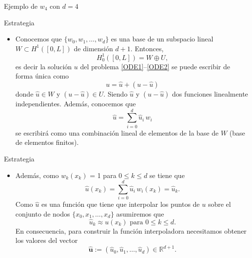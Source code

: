 \documentclass[10pt,handout]{beamer}
\theoremstyle{plain} %
\theoremstyle{plain} %
\theoremstyle{plain} %
\theoremstyle{plain} %
\theoremstyle{definition}
\theoremstyle{example}
\theoremstyle{example}
\theoremstyle{remark}
\theoremstyle{remark}
\begin{document}
\begin{frame}{Ejemplo de $w_4$ con $d=4$}
\end{frame}

\begin{frame}{Estrategia}
\begin{itemize}
\item Conocemos que $\{w_0,w_1,\ldots,w_d\}$ es una base de un subspacio lineal
$W \subset H^1([0,L])$ de dimensión $d+1.$ Entonces,
$$
H_0^1([0,L]) = W \oplus U,
$$
es decir la solución $u$ del problema \eqref{ODE1}--\eqref{ODE2} se puede escribir
de forma única como
$$
u = \widehat{u} + (u-\widehat{u})
$$
donde $ \widehat{u} \in W$ y $(u-\widehat{u}) \in U.$ Siendo $ \widehat{u}$ y $(u-\widehat{u})$ dos funciones linealmente independientes. Además, conocemos que
$$
\widehat{u} = \sum_{i=0}^d \widehat{u}_i \, w_i
$$
se escribirá como una combinación lineal de elementos de la base de $W$ (base de elementos finitos). 
\end{itemize}
\end{frame}

\begin{frame}{Estrategia}
\begin{itemize}
\item Además, como $w_k(x_k)$ = 1 para $0 \le k \le d$ se tiene que
$$
\widehat{u}(x_k) = \sum_{i=0}^d \widehat{u}_i \, w_i(x_k) = \widehat{u}_k.
$$
Como $\widehat{u}$ es una función que tiene que interpolar los puntos de $u$ sobre el conjunto
de nodos $\{x_0,x_1,\ldots,x_d\}$ asumiremos que 
$$
\widehat{u}_k \approx u(x_k) \text{ para } 0 \le k \le d.
$$
En consecuencia, para construir la función interpoladora necesitamos obtener los valores
del vector
$$
\widehat{\mathbf{u}}:=(\widehat{u}_0,\widehat{u}_1,\ldots,\widehat{u}_d) \in \mathbb{R}^{d+1}.
$$
\end{itemize}
\end{frame}
\end{document}
